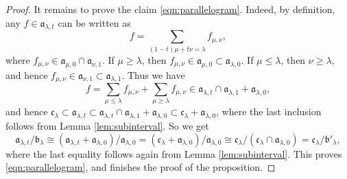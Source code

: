 \documentclass[10pt,a4paper]{amsart}
\newcommand{\fa}{\mathfrak{a}}
\newcommand{\fb}{\mathfrak{b}}
\newcommand{\fc}{\mathfrak{c}}
\begin{document}
\begin{proof}
    It remains to prove the claim \eqref{eqn:parallelogram}. Indeed, by definition, any $f\in\fa_{\lambda,t}$ can be written as
    \[
        f=\sum_{(1-t)\mu+t\nu=\lambda}f_{\mu,\nu},
    \]
    where $f_{\mu,\nu}\in\fa_{\mu,0}\cap\fa_{\nu,1}$. If $\mu\ge \lambda$, then $f_{\mu,\nu}\in\fa_{\mu,0}\subset \fa_{\lambda,0}$. If $\mu\le\lambda$, then $\nu\ge \lambda$, and hence $f_{\mu,\nu}\in\fa_{\nu,1}\subset \fa_{\lambda,1}$. Thus we have 
    \[
        f=\sum_{\mu\le\lambda}f_{\mu,\nu}+
        \sum_{\mu\ge\lambda}f_{\mu,\nu}\in
        \fa_{\lambda,t}\cap\fa_{\lambda,1}+\fa_{\lambda,0},
    \]
    and hence $\fc_\lambda\subset\fa_{\lambda,t}\subset\fa_{\lambda,t}\cap\fa_{\lambda,1}+\fa_{\lambda,0}\subset\fc_\lambda+\fa_{\lambda,0}$, where the last inclusion follows from Lemma \ref{lem:subinterval}. So we get
    \[
        \fa_{\lambda,t}/\fb_\lambda\cong
        (\fa_{\lambda,t}+\fa_{\lambda,0})/\fa_{\lambda,0}=(\fc_\lambda+\fa_{\lambda,0})/\fa_{\lambda,0}\cong\fc_\lambda/(\fc_\lambda\cap\fa_{\lambda,0})=\fc_\lambda/\fb'_\lambda,
    \]
    where the last equality follows again from Lemma \ref{lem:subinterval}. This proves \eqref{eqn:parallelogram}, and finishes the proof of the proposition.
\end{proof}
\end{document}
